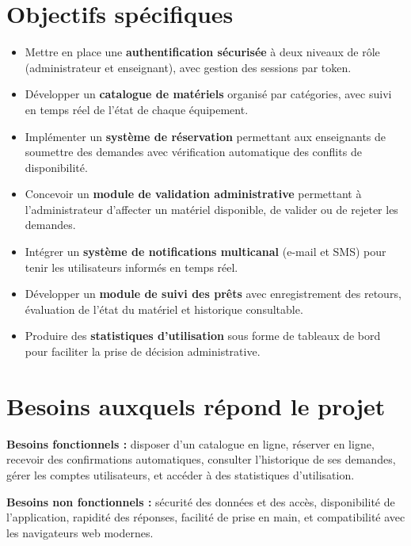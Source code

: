 \documentclass[12pt,a4paper]{report}
\begin{document}
\section{Objectifs sp\'ecifiques}

\begin{itemize}
  \item Mettre en place une \textbf{authentification s\'ecuris\'ee}
        \`a deux niveaux de r\^ole (administrateur et enseignant), avec
        gestion des sessions par token.
  \item D\'evelopper un \textbf{catalogue de mat\'eriels} organis\'e par
        cat\'egories, avec suivi en temps r\'eel de l'\'etat de chaque
        \'equipement.
  \item Impl\'ementer un \textbf{syst\`eme de r\'eservation} permettant
        aux enseignants de soumettre des demandes avec v\'erification
        automatique des conflits de disponibilit\'e.
  \item Concevoir un \textbf{module de validation administrative} permettant
        \`a l'administrateur d'affecter un mat\'eriel disponible, de valider
        ou de rejeter les demandes.
  \item Int\'egrer un \textbf{syst\`eme de notifications multicanal}
        (e-mail et SMS) pour tenir les utilisateurs inform\'es en temps r\'eel.
  \item D\'evelopper un \textbf{module de suivi des pr\^ets} avec
        enregistrement des retours, \'evaluation de l'\'etat du mat\'eriel
        et historique consultable.
  \item Produire des \textbf{statistiques d'utilisation} sous forme de
        tableaux de bord pour faciliter la prise de d\'ecision administrative.
\end{itemize}

\section{Besoins auxquels r\'epond le projet}

\textbf{Besoins fonctionnels :} disposer d'un catalogue en ligne, r\'eserver
en ligne, recevoir des confirmations automatiques, consulter l'historique
de ses demandes, g\'erer les comptes utilisateurs, et acc\'eder \`a des
statistiques d'utilisation.

\textbf{Besoins non fonctionnels :} s\'ecurit\'e des donn\'ees et des acc\`es,
disponibilit\'e de l'application, rapidit\'e des r\'eponses, facilit\'e de
prise en main, et compatibilit\'e avec les navigateurs web modernes.
\end{document}
